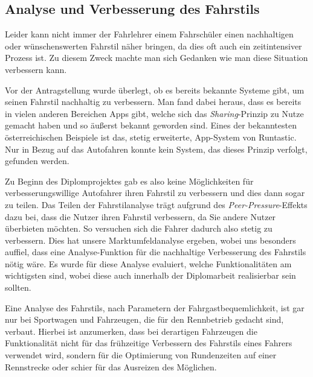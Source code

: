 \subsection{Analyse und Verbesserung des Fahrstils}

Leider kann nicht immer der Fahrlehrer einem Fahrschüler einen nachhaltigen oder wünschenswerten Fahrstil näher bringen, da dies oft auch ein zeitintensiver Prozess ist. Zu diesem Zweck machte man sich Gedanken wie man diese Situation verbessern kann.

Vor der Antragstellung wurde überlegt, ob es bereits bekannte Systeme gibt, um seinen Fahrstil nachhaltig zu verbessern. Man fand dabei heraus, dass es bereits in vielen anderen Bereichen Apps gibt, welche sich das \textit{Sharing}-Prinzip zu Nutze gemacht haben und so äußerst bekannt geworden sind. Eines der bekanntesten österreichischen Beispiele ist das, stetig erweiterte, App-System von Runtastic. \cite{SIMR.CH1-Fahrstil-Analyse.BusinessplanRuntastic}
Nur in Bezug auf das Autofahren konnte kein System, das dieses Prinzip verfolgt, gefunden werden.


Zu Beginn des Diplomprojektes gab es also keine Möglichkeiten für verbesserungswillige Autofahrer ihren Fahrstil zu verbessern und dies dann sogar zu teilen. Das Teilen der Fahrstilanalyse trägt aufgrund des \textit{Peer-Pressure}-Effekts dazu bei, dass die Nutzer ihren Fahrstil verbessern, da Sie andere Nutzer überbieten möchten. So versuchen sich die Fahrer dadurch also stetig zu verbessern.
Dies hat unsere Marktumfeldanalyse ergeben, wobei uns besonders auffiel, dass eine Analyse-Funktion für die nachhaltige Verbesserung des Fahrstils nötig wäre. Es wurde für diese Analyse evaluiert, welche Funktionalitäten am wichtigsten sind, wobei diese auch innerhalb der Diplomarbeit realisierbar sein sollten. 
\newline

Eine Analyse des Fahrstils, nach Parametern der Fahrgastbequemlichkeit, ist gar nur bei Sportwagen und Fahrzeugen, die für den Rennbetrieb gedacht sind, verbaut. Hierbei ist anzumerken, dass bei derartigen Fahrzeugen die Funktionalität nicht für das frühzeitige Verbessern des Fahrstils eines Fahrers verwendet wird, sondern für die Optimierung von Rundenzeiten auf einer Rennstrecke oder schier für das Ausreizen des Möglichen.

